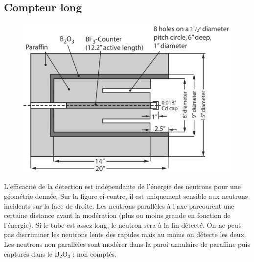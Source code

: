 \subsection{Compteur long}
	\begin{figure}
	\vspace{-5mm}
	\includegraphics[scale=0.35]{ch11/image8}
	\end{figure}
L'efficacité de la détection est indépendante de l'énergie des neutrons pour une géométrie donnée.
Sur la figure ci-contre, il est uniquement sensible aux neutrons incidents sur la face de droite.
Les neutrons parallèles à l'axe parcourent une certaine distance avant la modération (plus ou moins
grande en fonction de l'énergie). Si le tube est assez long, le neutron sera à la fin détecté. On 
ne peut pas discriminer les neutrons lents des rapides mais au moins on détecte les deux. Les 
neutrons non parallèles sont modérer dans la paroi annulaire de paraffine puis capturés dans le 
B$_2$O$_3$ : non comptés.

